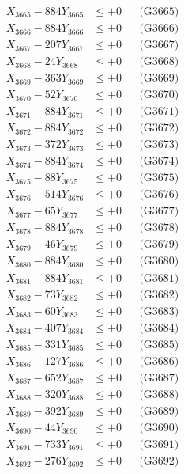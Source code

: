 \documentclass[a4paper,10pt]{article}
\begin{document}
{\begin{align}
X_{3665} - 884Y_{3665} &\leq +0 && \text{(G3665)} \\
X_{3666} - 884Y_{3666} &\leq +0 && \text{(G3666)} \\
X_{3667} - 207Y_{3667} &\leq +0 && \text{(G3667)} \\
X_{3668} - 24Y_{3668} &\leq +0 && \text{(G3668)} \\
X_{3669} - 363Y_{3669} &\leq +0 && \text{(G3669)} \\
X_{3670} - 52Y_{3670} &\leq +0 && \text{(G3670)} \\
\allowbreak
X_{3671} - 884Y_{3671} &\leq +0 && \text{(G3671)} \\
X_{3672} - 884Y_{3672} &\leq +0 && \text{(G3672)} \\
X_{3673} - 372Y_{3673} &\leq +0 && \text{(G3673)} \\
X_{3674} - 884Y_{3674} &\leq +0 && \text{(G3674)} \\
X_{3675} - 88Y_{3675} &\leq +0 && \text{(G3675)} \\
X_{3676} - 514Y_{3676} &\leq +0 && \text{(G3676)} \\
X_{3677} - 65Y_{3677} &\leq +0 && \text{(G3677)} \\
X_{3678} - 884Y_{3678} &\leq +0 && \text{(G3678)} \\
X_{3679} - 46Y_{3679} &\leq +0 && \text{(G3679)} \\
X_{3680} - 884Y_{3680} &\leq +0 && \text{(G3680)} \\
\allowbreak
X_{3681} - 884Y_{3681} &\leq +0 && \text{(G3681)} \\
X_{3682} - 73Y_{3682} &\leq +0 && \text{(G3682)} \\
X_{3683} - 60Y_{3683} &\leq +0 && \text{(G3683)} \\
X_{3684} - 407Y_{3684} &\leq +0 && \text{(G3684)} \\
X_{3685} - 331Y_{3685} &\leq +0 && \text{(G3685)} \\
X_{3686} - 127Y_{3686} &\leq +0 && \text{(G3686)} \\
X_{3687} - 652Y_{3687} &\leq +0 && \text{(G3687)} \\
X_{3688} - 320Y_{3688} &\leq +0 && \text{(G3688)} \\
X_{3689} - 392Y_{3689} &\leq +0 && \text{(G3689)} \\
X_{3690} - 44Y_{3690} &\leq +0 && \text{(G3690)} \\
\allowbreak
X_{3691} - 733Y_{3691} &\leq +0 && \text{(G3691)} \\
X_{3692} - 276Y_{3692} &\leq +0 && \text{(G3692)} \\

\end{align}}
\end{document}
